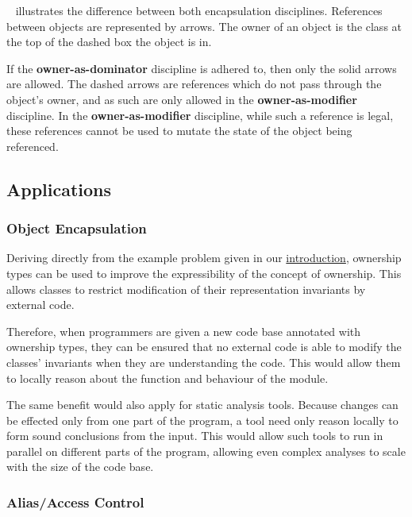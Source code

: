\documentclass{acm_proc_article-sp}
\begin{document}
~\cite{dietl09gut} illustrates the 
difference between both encapsulation disciplines. References between objects 
are represented by arrows. The owner of an object is the class at the top of 
the dashed box the object is in.

If the \textbf{owner-as-dominator} discipline is adhered to, then only the 
solid arrows are allowed. The dashed arrows are references which do not pass 
through the object's owner, and as such are only allowed in the 
\textbf{owner-as-modifier} discipline. In the \textbf{owner-as-mod\-ifier} 
discipline, while such a reference is legal, these references cannot be used to 
mutate the state of the object being referenced.

\subsection{Applications}
\label{subsec:applications}

\subsubsection{Object Encapsulation}
\label{subsubsec:object_encapsulation}

Deriving directly from the example problem given in our 
\hyperref[code:modular_reasoning_car_engine_1]{introduction}, ownership types 
can be used to improve the expressibility of the concept of ownership. This 
allows classes to restrict modification of their representation invariants by 
external code.

Therefore, when programmers are given a new code base annotated with ownership 
types, they can be ensured that no external code is able to modify the classes' 
invariants when they are understanding the code. This would allow them to 
locally reason about the function and behaviour of the module.

The same benefit would also apply for static analysis tools. Because changes 
can be effected only from one part of the program, a tool need only reason 
locally to form sound conclusions from the input. This would allow such tools 
to run in parallel on different parts of the program, allowing even complex 
analyses to scale with the size of the code base.

\subsubsection{Alias/Access Control}
\label{subsubsec:alias_control}
\end{document}
